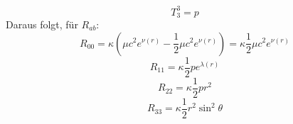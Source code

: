 \documentclass[a4paper]{article}
\begin{document}
\begin{equation}
    T^3_3=p
\end{equation}
Daraus folgt, für $R_{ab}$:
\begin{equation}
    R_{00}=\kappa(\mu c^2e^{\nu(r)}-\frac{1}{2}\mu c^2e^{\nu(r)})=\kappa\frac{1}{2}\mu c^2e^{\nu(r)}
\end{equation}
\begin{equation}
    R_{11}=\kappa\frac{1}{2}pe^{\lambda(r)}
\end{equation}
\begin{equation}
    R_{22}=\kappa\frac{1}{2}pr^2
\end{equation}
\begin{equation}
    R_{33}=\kappa\frac{1}{2}r^2\sin^2{\theta}
\end{equation}
\end{document}
